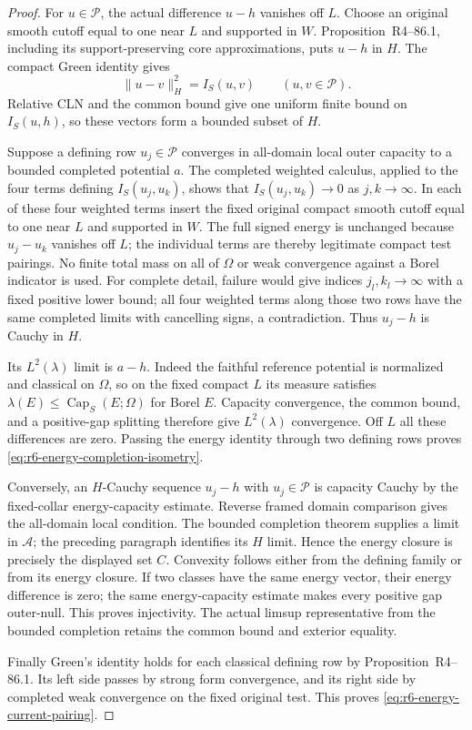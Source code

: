 \documentclass[11pt,a4paper]{article}
\numberwithin{equation}{section}
\theoremstyle{definition}
\theoremstyle{remark}
\begin{document}
\begin{proof}
For $u\in\mathscr P$, the actual difference $u-h$ vanishes off $L$.
Choose an original smooth cutoff equal to one near $L$ and supported in
$W$. Proposition~\textup{R4--86.1}, including its
support-preserving core approximations, puts $u-h$ in $H$.
The compact Green identity gives
\[
       \|u-v\|_H^2=I_S(u,v)\qquad(u,v\in\mathscr P).
\]
Relative CLN and the common bound give one uniform finite bound on
$I_S(u,h)$, so these vectors form a bounded subset of $H$.

Suppose a defining row $u_j\in\mathscr P$ converges in all-domain local
outer capacity to a bounded completed potential $a$. The completed
weighted calculus, applied to the four terms defining $I_S(u_j,u_k)$,
shows that $I_S(u_j,u_k)\to0$ as $j,k\to\infty$. In each of these
four weighted terms insert the fixed original compact smooth cutoff
equal to one near $L$ and supported in $W$. The full signed energy is
unchanged because $u_j-u_k$ vanishes off $L$; the individual terms are
thereby legitimate compact test pairings. No finite total mass on all
of $\Omega$ or weak convergence against a Borel indicator is used.
For complete detail,
failure would give indices $j_l,k_l\to\infty$ with a fixed positive
lower bound; all four weighted terms along those two rows have the same
completed limits with cancelling signs, a contradiction. Thus
$u_j-h$ is Cauchy in $H$.

Its $L^2(\lambda)$ limit is $a-h$. Indeed the faithful reference
potential is normalized and classical on $\Omega$, so on the fixed
compact $L$ its measure satisfies
$\lambda(E)\le\operatorname{Cap}_S(E;\Omega)$ for Borel $E$.
Capacity convergence, the common bound, and a positive-gap splitting
therefore give $L^2(\lambda)$ convergence. Off $L$ all these differences
are zero. Passing the energy identity through two defining rows proves
\eqref{eq:r6-energy-completion-isometry}.

Conversely, an $H$-Cauchy sequence $u_j-h$ with $u_j\in\mathscr P$
is capacity Cauchy by the fixed-collar energy-capacity estimate. Reverse
framed domain comparison gives the all-domain local condition.
The bounded completion theorem supplies a limit in $\mathscr A$;
the preceding paragraph identifies its $H$ limit. Hence the energy
closure is precisely the displayed set $C$. Convexity follows either
from the defining family or from its energy closure. If two classes
have the same energy vector, their energy difference is zero;
the same energy-capacity estimate makes every positive gap outer-null.
This proves injectivity. The actual limsup representative from the
bounded completion retains the common bound and exterior equality.

Finally Green's identity holds for each classical defining row by
Proposition~\textup{R4--86.1}. Its left side passes by
strong form convergence, and its right side by completed weak
convergence on the fixed original test. This proves
\eqref{eq:r6-energy-current-pairing}.
\end{proof}
\end{document}
